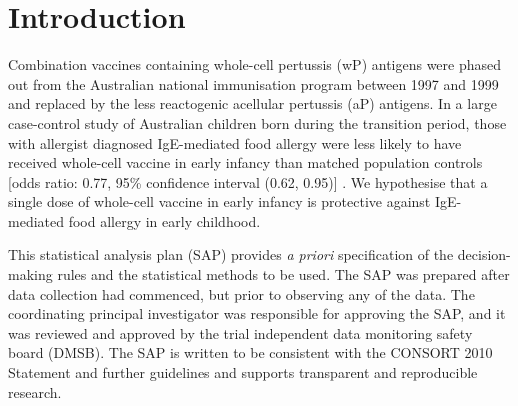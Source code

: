 \documentclass{bmcart}
\begin{document}


\section*{Introduction}

Combination vaccines containing whole-cell pertussis (wP) antigens were phased out from the Australian national immunisation program between 1997 and 1999 and replaced by the less reactogenic acellular pertussis (aP) antigens.
In a large case-control study of Australian children born during the transition period, those with allergist diagnosed IgE-mediated food allergy were less likely to have received whole-cell vaccine in early infancy than matched population controls [odds ratio: 0.77, 95\% confidence interval (0.62, 0.95)] \cite{estcourt2020whole}.
We hypothesise that a single dose of whole-cell vaccine in early infancy is protective against IgE-mediated food allergy in early childhood.

This statistical analysis plan (SAP) provides \textit{a priori} specification of the decision-making rules and the statistical methods to be used. 
The SAP was prepared after data collection had commenced, but prior to observing any of the data. 
The coordinating principal investigator was responsible for approving the SAP, and it was reviewed and approved by the trial independent data monitoring safety board (DMSB). 
The SAP is written to be consistent with the CONSORT 2010 Statement and further guidelines and supports transparent and reproducible research.
\end{document}
